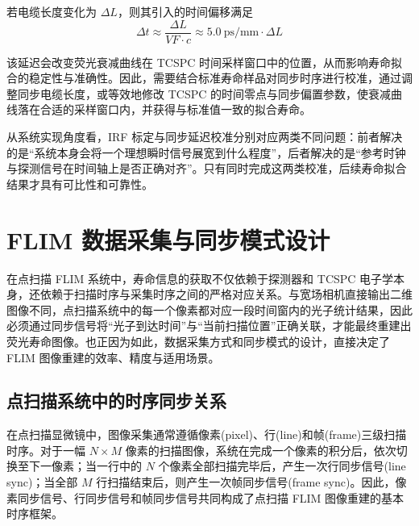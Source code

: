若电缆长度变化为 $\Delta L$，则其引入的时间偏移满足
\begin{equation}
  \Delta t \approx \frac{\Delta L}{VF\cdot c}\approx 5.0~\text{ps/mm}\cdot \Delta L
\end{equation}

该延迟会改变荧光衰减曲线在 TCSPC 时间采样窗口中的位置，从而影响寿命拟合的稳定性与准确性。因此，需要结合标准寿命样品对同步时序进行校准，通过调整同步电缆长度，或等效地修改 TCSPC 的时间零点与同步偏置参数，使衰减曲线落在合适的采样窗口内，并获得与标准值一致的拟合寿命。

从系统实现角度看，IRF 标定与同步延迟校准分别对应两类不同问题：前者解决的是``系统本身会将一个理想瞬时信号展宽到什么程度''，后者解决的是``参考时钟与探测信号在时间轴上是否正确对齐''。只有同时完成这两类校准，后续寿命拟合结果才具有可比性和可靠性。





\section{FLIM 数据采集与同步模式设计}\label{5.3}

在点扫描 FLIM 系统中，寿命信息的获取不仅依赖于探测器和 TCSPC 电子学本身，还依赖于扫描时序与采集时序之间的严格对应关系。与宽场相机直接输出二维图像不同，点扫描系统中的每一个像素都对应一段时间窗内的光子统计结果，因此必须通过同步信号将``光子到达时间''与``当前扫描位置''正确关联，才能最终重建出荧光寿命图像。也正因为如此，数据采集方式和同步模式的设计，直接决定了 FLIM 图像重建的效率、精度与适用场景。



\subsection{点扫描系统中的时序同步关系}\label{5.3.1}

在点扫描显微镜中，图像采集通常遵循像素(pixel)、行(line)和帧(frame)三级扫描时序。对于一幅 $N\times M$ 像素的扫描图像，系统在完成一个像素的积分后，依次切换至下一像素；当一行中的 $N$ 个像素全部扫描完毕后，产生一次行同步信号(line sync)；当全部 $M$ 行扫描结束后，则产生一次帧同步信号(frame sync)。因此，像素同步信号、行同步信号和帧同步信号共同构成了点扫描 FLIM 图像重建的基本时序框架。

